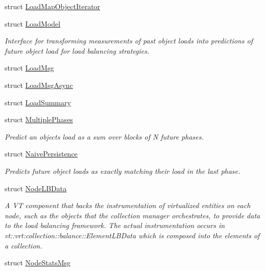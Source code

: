 \begin{DoxyCompactItemize}
\item 
struct \hyperlink{structvt_1_1vrt_1_1collection_1_1balance_1_1_load_map_object_iterator}{Load\+Map\+Object\+Iterator}
\item 
struct \hyperlink{structvt_1_1vrt_1_1collection_1_1balance_1_1_load_model}{Load\+Model}
\begin{DoxyCompactList}\small\item\em Interface for transforming measurements of past object loads into predictions of future object load for load balancing strategies. \end{DoxyCompactList}\item 
struct \hyperlink{structvt_1_1vrt_1_1collection_1_1balance_1_1_load_msg}{Load\+Msg}
\item 
struct \hyperlink{structvt_1_1vrt_1_1collection_1_1balance_1_1_load_msg_async}{Load\+Msg\+Async}
\item 
struct \hyperlink{structvt_1_1vrt_1_1collection_1_1balance_1_1_load_summary}{Load\+Summary}
\item 
struct \hyperlink{structvt_1_1vrt_1_1collection_1_1balance_1_1_multiple_phases}{Multiple\+Phases}
\begin{DoxyCompactList}\small\item\em Predict an object\textquotesingle{}s load as a sum over blocks of N future phases. \end{DoxyCompactList}\item 
struct \hyperlink{structvt_1_1vrt_1_1collection_1_1balance_1_1_naive_persistence}{Naive\+Persistence}
\begin{DoxyCompactList}\small\item\em Predicts future object loads as exactly matching their load in the last phase. \end{DoxyCompactList}\item 
struct \hyperlink{structvt_1_1vrt_1_1collection_1_1balance_1_1_node_l_b_data}{Node\+L\+B\+Data}
\begin{DoxyCompactList}\small\item\em A VT component that backs the instrumentation of virtualized entities on each node, such as the objects that the collection manager orchestrates, to provide data to the load balancing framework. The actual instrumentation occurs in {\ttfamily vt\+::vrt\+:collection\+:}\+:balance\+::\+Element\+L\+B\+Data which is composed into the elements of a collection. \end{DoxyCompactList}\item 
struct \hyperlink{structvt_1_1vrt_1_1collection_1_1balance_1_1_node_stats_msg}{Node\+Stats\+Msg}

\end{DoxyCompactItemize}
